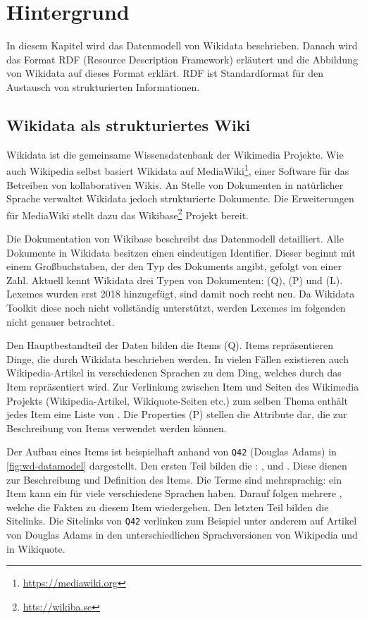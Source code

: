 %
\chapter{Hintergrund}
\label{sec:concepts}
In diesem Kapitel wird das Datenmodell von Wikidata beschrieben.
Danach wird das Format RDF (Resource Description Framework) erläutert und die Abbildung von Wikidata auf dieses Format erklärt.
RDF ist Standardformat für den Austausch von strukturierten Informationen. 

\section{Wikidata als strukturiertes Wiki}
Wikidata ist die gemeinsame Wissensdatenbank der Wikimedia Projekte.
Wie auch Wikipedia selbst basiert Wikidata auf MediaWiki\footnote{\url{https://mediawiki.org}}, einer Software für das Betreiben von kollaborativen Wikis.
An Stelle von Dokumenten in natürlicher Sprache verwaltet Wikidata jedoch strukturierte Dokumente.
Die Erweiterungen für MediaWiki stellt dazu das Wikibase\footnote{\url{htts://wikiba.se}} Projekt bereit.

Die Dokumentation von Wikibase \cite{wikibase-data-model} beschreibt das Datenmodell detailliert.
Alle Dokumente in Wikidata besitzen einen eindeutigen Identifier.
Dieser beginnt mit einem Großbuchstaben, der den Typ des Dokuments angibt, gefolgt von einer Zahl.
Aktuell kennt Wikidata drei Typen von Dokumenten:  (Q),  (P) und  (L).
Lexemes wurden erst 2018 hinzugefügt, sind damit noch recht neu.
Da Wikidata Toolkit diese noch nicht vollständig unterstützt, werden Lexemes im folgenden nicht genauer betrachtet.

Den Hauptbestandteil der Daten bilden die Items (Q).
Items repräsentieren Dinge, die durch Wikidata beschrieben werden.
In vielen Fällen existieren auch Wikipedia-Artikel in verschiedenen Sprachen zu dem Ding, welches durch das Item repräsentiert wird.
Zur Verlinkung zwischen Item und Seiten des Wikimedia Projekts (Wikipedia-Artikel, Wikiquote-Seiten etc.) zum selben Thema enthält jedes Item eine Liste von .
Die Properties (P) stellen die Attribute dar, die zur Beschreibung von Items verwendet werden können.

Der Aufbau eines Items ist beispielhaft anhand von \verb|Q42| (Douglas Adams) in \cref{fig:wd-datamodel} dargestellt.
Den ersten Teil bilden die : ,  und .
Diese dienen zur Beschreibung und Definition des Items.
Die Terme sind mehrsprachig: ein Item kann ein  für viele verschiedene Sprachen haben.
Darauf folgen mehrere , welche die Fakten zu diesem Item wiedergeben.
Den letzten Teil bilden die Sitelinks.
Die Sitelinks von \verb|Q42| verlinken zum Beispiel unter anderem auf Artikel von Douglas Adams in den unterschiedlichen Sprachversionen von Wikipedia und in Wikiquote.

